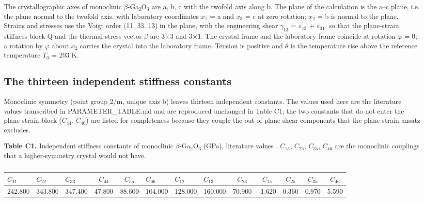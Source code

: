 \documentclass[preprint,12pt]{elsarticle}
\begin{document}
The crystallographic axes of monoclinic $\beta$-Ga$_2$O$_3$ are a, b, c with the twofold axis along b. The plane of the calculation is the a--c plane, i.e. the plane normal to the twofold axis, with laboratory coordinates $x_{1}$ = a and $x_{3}$ = c at zero rotation; $x_{2}$ = b is normal to the plane. Strains and stresses use the Voigt order (11, 33, 13) in the plane, with the engineering shear $\gamma_{13}$ = $\varepsilon_{13}$ + $\varepsilon_{31}$, so that the plane-strain stiffness block Q and the thermal-stress vector $\beta$ are 3$\times$3 and 3$\times$1. The crystal frame and the laboratory frame coincide at rotation $\varphi$ = 0; a rotation by $\varphi$ about $x_{2}$ carries the crystal into the laboratory frame. Tension is positive and $\theta$ is the temperature rise above the reference temperature $T_{0}$ = 293 K.

\subsection{The thirteen independent stiffness constants}
\label{sec:1.2}

Monoclinic symmetry (point group 2/m, unique axis b) leaves thirteen independent constants. The values used here are the literature values transcribed in PARAMETER\_TABLE.md \cite{gurtin1968,tzou1995} and are reproduced unchanged in Table C1; the two constants that do not enter the plane-strain block ($C_{44}$, $C_{46}$) are listed for completeness because they couple the out-of-plane shear components that the plane-strain ansatz excludes.

\textbf{Table C1.} Independent stiffness constants of monoclinic $\beta$-Ga$_2$O$_3$ (GPa), literature values \cite{gurtin1968}. $C_{15}$, $C_{25}$, $C_{35}$, $C_{46}$ are the monoclinic couplings that a higher-symmetry crystal would not have.

\begin{table}[htbp]
\centering
\caption{}
\label{tab:?}
\begin{tabular}{lllcclllccccc}
\toprule
$C_{11}$ & $C_{22}$ & $C_{33}$ & $C_{44}$ & $C_{55}$ & $C_{66}$ & $C_{12}$ & $C_{13}$ & $C_{23}$ & $C_{15}$ & $C_{25}$ & $C_{35}$ & $C_{46}$ \\
\midrule
242.800 & 343.800 & 347.400 & 47.800 & 88.600 & 104.000 & 128.000 & 160.000 & 70.900 & -1.620 & 0.360 & 0.970 & 5.590 \\
\bottomrule
\end{tabular}
\end{table}
\end{document}
